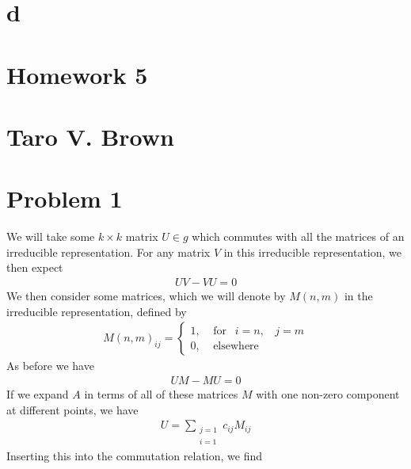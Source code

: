 \documentclass[a4paper,12pt]{article}
\begin{document}
\section{d}
\newpage
\section*{Homework 5\\\\
	Taro V. Brown}\vspace*{1cm}
\section*{Problem 1}
We will take some $k\times k$ matrix $U\in g$ which commutes with all the matrices of an irreducible representation. For any matrix $V$ in this irreducible representation, we then expect 
\begin{equation}
	\begin{aligned}
		UV-VU=0
	\end{aligned}
\end{equation} 
We then consider some matrices, which we will denote by $M(n,m)$ in the irreducible representation, defined by
\begin{equation}
	\begin{aligned}
		M(n,m)_{ij}=\begin{cases}
			1,~~~~~\text{for }~~i=n,~~~~j=m\\
			0,~~~~~\text{elsewhere } 
		\end{cases}
	\end{aligned}
\end{equation}
As before we have
\begin{equation}
	\begin{aligned}
		UM-MU=0
	\end{aligned}
\end{equation}
If we expand $A$ in terms of all of these matrices $M$ with one non-zero component at different points, we have
\begin{equation}
	\begin{aligned}
		U=\sum_{\substack{j=1\\i=1}}c_{ij}M_{ij}
	\end{aligned}
\end{equation}
Inserting this into the commutation relation, we find
\end{document}
